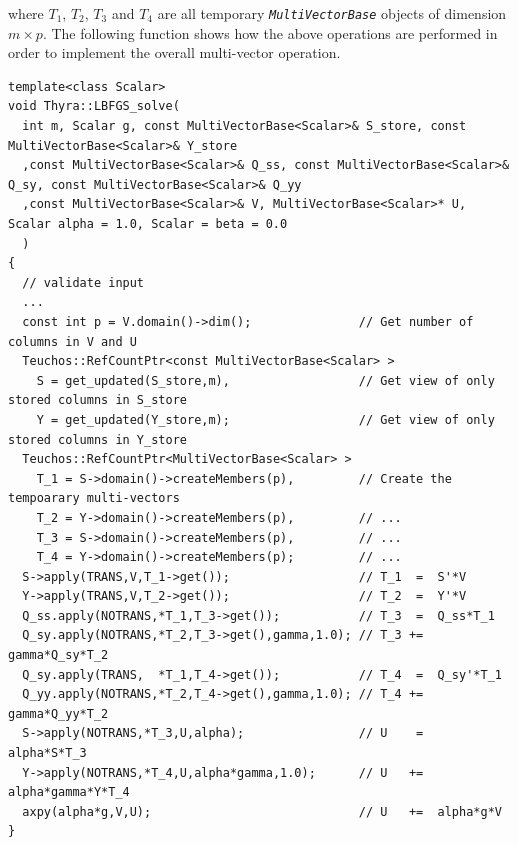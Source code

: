 \documentclass[pdf,ps2pdf,11pt]{SANDreport}
\begin{document}
{}\noindent{}where $T_1$, $T_2$, $T_3$ and $T_4$ are all temporary
{}\texttt{\textit{Multi\-Vector\-Base}} objects of dimension $m \times p$.
The following function shows how the above operations are performed in
order to implement the overall multi-vector operation.

{\scriptsize\begin{verbatim}
template<class Scalar>
void Thyra::LBFGS_solve(
  int m, Scalar g, const MultiVectorBase<Scalar>& S_store, const MultiVectorBase<Scalar>& Y_store
  ,const MultiVectorBase<Scalar>& Q_ss, const MultiVectorBase<Scalar>& Q_sy, const MultiVectorBase<Scalar>& Q_yy
  ,const MultiVectorBase<Scalar>& V, MultiVectorBase<Scalar>* U, Scalar alpha = 1.0, Scalar = beta = 0.0
  )
{
  // validate input
  ...
  const int p = V.domain()->dim();               // Get number of columns in V and U
  Teuchos::RefCountPtr<const MultiVectorBase<Scalar> >
    S = get_updated(S_store,m),                  // Get view of only stored columns in S_store
    Y = get_updated(Y_store,m);                  // Get view of only stored columns in Y_store
  Teuchos::RefCountPtr<MultiVectorBase<Scalar> >
    T_1 = S->domain()->createMembers(p),         // Create the tempoarary multi-vectors
    T_2 = Y->domain()->createMembers(p),         // ...
    T_3 = S->domain()->createMembers(p),         // ...
    T_4 = Y->domain()->createMembers(p);         // ...
  S->apply(TRANS,V,T_1->get());                  // T_1  =  S'*V
  Y->apply(TRANS,V,T_2->get());                  // T_2  =  Y'*V
  Q_ss.apply(NOTRANS,*T_1,T_3->get());           // T_3  =  Q_ss*T_1
  Q_sy.apply(NOTRANS,*T_2,T_3->get(),gamma,1.0); // T_3 +=  gamma*Q_sy*T_2
  Q_sy.apply(TRANS,  *T_1,T_4->get());           // T_4  =  Q_sy'*T_1
  Q_yy.apply(NOTRANS,*T_2,T_4->get(),gamma,1.0); // T_4 +=  gamma*Q_yy*T_2
  S->apply(NOTRANS,*T_3,U,alpha);                // U    =  alpha*S*T_3
  Y->apply(NOTRANS,*T_4,U,alpha*gamma,1.0);      // U   +=  alpha*gamma*Y*T_4
  axpy(alpha*g,V,U);                             // U   +=  alpha*g*V
}
\end{verbatim}}
\end{document}
